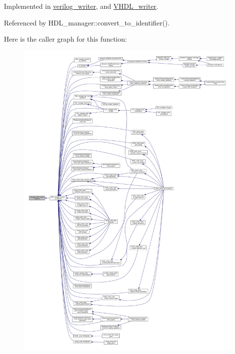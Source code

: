 Implemented in \hyperlink{classverilog__writer_a1595f62191efb28fa23d944791bbdd71}{verilog\+\_\+writer}, and \hyperlink{structVHDL__writer_a5c9eb93fec5f11553f37873b107dd739}{V\+H\+D\+L\+\_\+writer}.



Referenced by H\+D\+L\+\_\+manager\+::convert\+\_\+to\+\_\+identifier().

Here is the caller graph for this function\+:
\nopagebreak
\begin{figure}[H]
\begin{center}
\leavevmode
\includegraphics[width=350pt]{d6/d67/classlanguage__writer_a5a69f96be3c6c3cab69325058c077d21_icgraph}
\end{center}
\end{figure}
\mbox{\label{classlanguage__writer_ae0ae8fbdc6d0a7e8a22b4344672c45ef}} 
